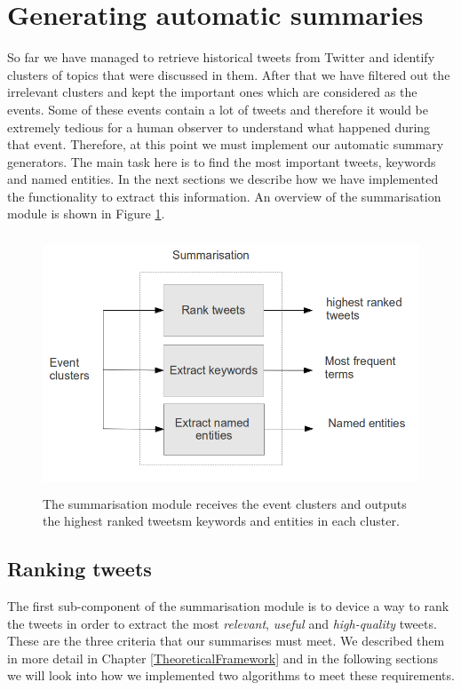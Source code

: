 \section{Generating automatic summaries}
So far we have managed to retrieve historical tweets from Twitter and identify clusters of topics that were discussed in them. After that we have filtered out the irrelevant clusters and kept the important ones which are considered as the events. Some of these events contain a lot of tweets and therefore it would be extremely tedious for a human observer to understand what happened during that event. Therefore, at this point we must implement our automatic summary generators. The main task here is to find the most important tweets, keywords and named entities. In the next sections we describe how we have implemented the functionality to extract this information. An overview of the summarisation module is shown in Figure \ref{SummarisationOverview}.  

\begin{figure}[!htbp]
  \begin{center}
    \includegraphics[height=3.0in, width=6in]{summarisation-overview}
    \caption{The summarisation module receives the event clusters and outputs the highest ranked tweetsm keywords and entities in each cluster.}
    \label{SummarisationOverview}
  \end{center}
\end{figure} 

\subsection{Ranking tweets}
The first sub-component of the summarisation module is to device a way to rank the tweets in order to extract the most \emph{relevant}, \emph{useful} and \emph{high-quality} tweets. These are the three criteria that our summarises must meet. We described them in more detail in Chapter \ref{TheoreticalFramework} and in the following sections we will look into how we implemented two algorithms to meet these requirements.  

